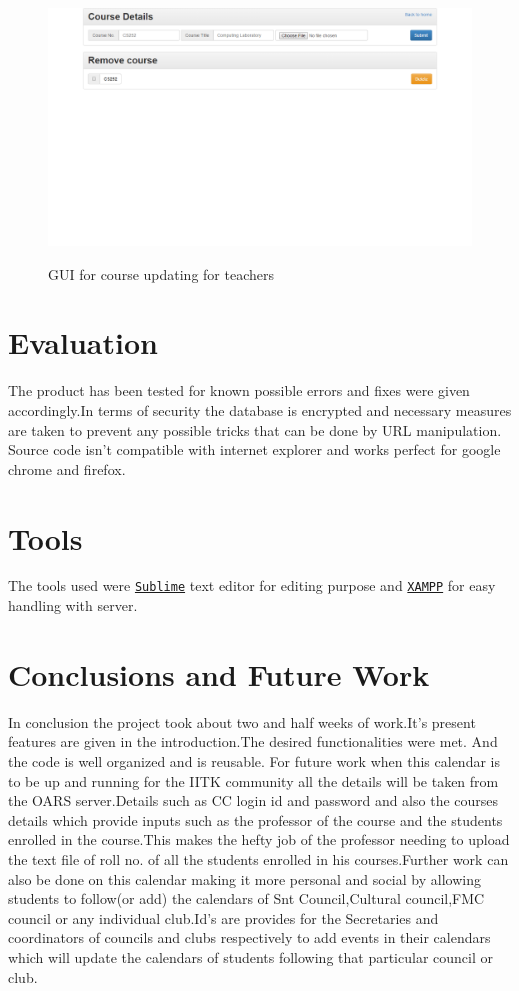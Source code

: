 \documentclass[a4paper, 12pt]{article}
\begin{document}
\begin{figure}[H]
	\caption{GUI for course updating for teachers}
	\vspace{.5cm}
	\includegraphics[width=0.95\columnwidth]{update_course}
	\label{fig:figure5}
\end{figure}

\section{Evaluation}
The product has been tested for known possible errors and fixes were given accordingly.In terms of security the database is encrypted and necessary measures are taken to prevent any possible tricks that can be done by URL manipulation. Source code isn't compatible with internet explorer and works perfect for google chrome and firefox.
\section{Tools}
The tools used were \texttt{\href{http://www.sublimetext.com/}{Sublime}} text editor for editing purpose and  \texttt{\href{https://www.apachefriends.org/index.html}{XAMPP}} for easy handling with server.
\section{Conclusions and Future Work}
In conclusion the project took about two and half weeks of work.It's present features are given in the introduction.The desired functionalities were met. And the code is well organized and is reusable.
For future work when this calendar is to be up and running for the IITK community all the details will be taken from the OARS server.Details such as CC login id and password and also the courses details which provide inputs such as the professor of the course and the students enrolled in the course.This makes the hefty job of the professor needing to upload the text file of roll no. of all the students enrolled in his courses.Further work can also be done on this calendar making it more personal and social by allowing students to follow(or add) the calendars of Snt Council,Cultural council,FMC council or any individual club.Id's are provides for the Secretaries and coordinators of councils and clubs respectively to add events in their calendars which will update the calendars of students following that particular council or club.
\end{document}
